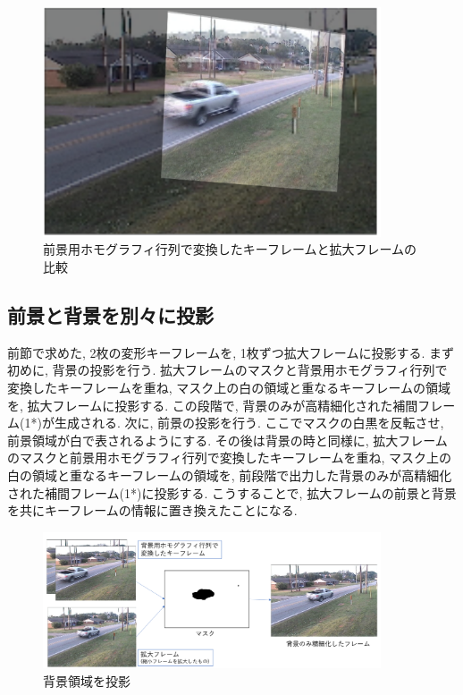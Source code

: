 \documentclass[a4paper,12pt]{jsreport}
\begin{document}
\begin{figure}[h]
  \begin{center}
    \includegraphics[width=10cm]{./teian_2_2.png}
    \caption{前景用ホモグラフィ行列で変換したキーフレームと拡大フレームの比較}
  \end{center}
\end{figure}


\subsection{前景と背景を別々に投影}
前節で求めた, 2枚の変形キーフレームを, 1枚ずつ拡大フレームに投影する.
まず初めに, 背景の投影を行う. 拡大フレームのマスクと背景用ホモグラフィ行列で変換したキーフレームを重ね, マスク上の白の領域と重なるキーフレームの領域を, 拡大フレームに投影する. この段階で, 背景のみが高精細化された補間フレーム(1*)が生成される. 
次に, 前景の投影を行う. ここでマスクの白黒を反転させ, 前景領域が白で表されるようにする. その後は背景の時と同様に, 拡大フレームのマスクと前景用ホモグラフィ行列で変換したキーフレームを重ね, マスク上の白の領域と重なるキーフレームの領域を, 前段階で出力した背景のみが高精細化された補間フレーム(1*)に投影する. こうすることで, 拡大フレームの前景と背景を共にキーフレームの情報に置き換えたことになる. 

\begin{figure}[h]
  \begin{center}
    \includegraphics[width=10cm]{./teian_3_1.png}
    \caption{背景領域を投影}
  \end{center}
\end{figure}
\end{document}
